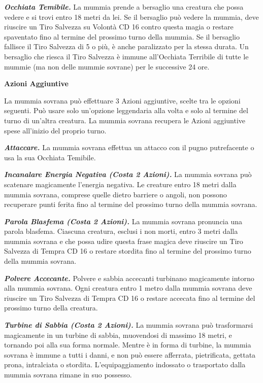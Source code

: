 \begin{multicols}{2}
\emph{\textbf{Occhiata Temibile.}} La mummia prende a bersaglio una creatura che possa vedere e si trovi entro 18 metri da lei. Se il bersaglio può vedere la mummia, deve riuscire un Tiro Salvezza su Volontà CD 16 contro questa magia o restare spaventato fino al termine del prossimo turno della mummia. Se il bersaglio fallisce il Tiro Salvezza di 5 o più, è anche paralizzato per la stessa durata. Un bersaglio che riesca il Tiro Salvezza è immune all'Occhiata Terribile di tutte le mummie (ma non delle mummie sovrane) per le successive 24 ore.

\textbf{Azioni Aggiuntive}

La mummia sovrana può effettuare 3 Azioni aggiuntive, scelte tra le opzioni seguenti. Può usare solo un'opzione leggendaria alla volta e solo al termine del turno di un'altra creatura. La mummia sovrana recupera le Azioni aggiuntive spese all'inizio del proprio turno.

\emph{\textbf{Attaccare.}} La mummia sovrana effettua un attacco con il pugno putrefacente o usa la sua Occhiata Temibile.

\emph{\textbf{Incanalare Energia Negativa (Costa 2 Azioni).}} La mummia sovrana può scatenare magicamente l'energia negativa. Le creature entro 18 metri dalla mummia sovrana, comprese quelle dietro barriere o angoli, non possono recuperare punti ferita fino al termine del prossimo turno della mummia sovrana.

\emph{\textbf{Parola Blasfema (Costa 2 Azioni).}} La mummia sovrana pronuncia una parola blasfema. Ciascuna creatura, esclusi i non morti, entro 3 metri dalla mummia sovrana e che possa udire questa frase magica deve riuscire un Tiro Salvezza di Tempra CD 16 o restare stordita fino al termine del prossimo turno della mummia sovrana.

\emph{\textbf{Polvere Accecante.}} Polvere e sabbia accecanti turbinano magicamente intorno alla mummia sovrana. Ogni creatura entro 1 metro dalla mummia sovrana deve riuscire un Tiro Salvezza di Tempra CD 16 o restare accecata fino al termine del prossimo turno della creatura.

\emph{\textbf{Turbine di Sabbia (Costa 2 Azioni).}} La mummia sovrana può trasformarsi magicamente in un turbine di sabbia, muovendosi di massimo 18 metri, e tornando poi alla sua forma normale. Mentre è in forma di turbine, la mummia sovrana è immune a tutti i danni, e non può essere afferrata, pietrificata, gettata prona, intralciata o stordita. L'equipaggiamento indossato o trasportato dalla mummia sovrana rimane in suo possesso.


\end{multicols}
